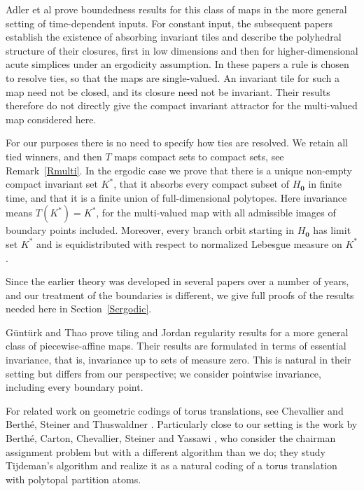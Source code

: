 \documentclass[11pt,reqno,tbtags,a4paper]{amsart}
\numberwithin{equation}{section}
\theoremstyle{plain}%
\theoremstyle{definition}
\theoremstyle{remark}
\newcommand{\refR}[1]{Remark~\ref{#1}}
\newcounter{CC}
\newcommand\Ho{H_{\0}}
\newcommand\etal{{et al\xperiod}}
\newcommand\Kx{K^*}
\newcommand\0{{\boldsymbol 0}}
\newcommand\1{{\boldsymbol 1}}
\begin{document}
Adler \etal{} \cite{adler0} prove boundedness results 
for this class of maps
in the more general
setting of time-dependent inputs. For constant input, the subsequent
papers \cite{adler10,adler17,adler18} establish the existence of absorbing
invariant tiles and describe the polyhedral structure of their closures,
first in low dimensions and then for higher-dimensional acute simplices
under an ergodicity assumption. In these papers a rule is chosen to
resolve ties, so that the maps are single-valued. An invariant tile for
such a map need not be closed, and its closure need not be invariant.
Their results therefore do not directly give the compact invariant
attractor for the multi-valued map considered here.

For our purposes there is no need to specify how ties are resolved.
We retain all tied winners, and then $T$ maps compact sets to compact
sets, see \refR{Rmulti}. In the ergodic case we prove that there is a
unique non-empty compact invariant set $\Kx$, that it absorbs every
compact subset of $\Ho$ in finite time, and that it is a finite union of
full-dimensional polytopes. Here invariance means $T(\Kx)=\Kx$, 
for the multi-valued map
with all
admissible images of boundary points included. Moreover, every branch
orbit starting in $\Ho$ has limit set $\Kx$ and is equidistributed with
respect to normalized Lebesgue measure on $\Kx$.

Since the earlier theory was developed in several papers over a number
of years, and our treatment of the boundaries is different, we give
full proofs of the results needed here in Section~\ref{Sergodic}.

G\"unt\"urk and Thao \cite{gun} prove tiling and Jordan regularity
results for a more general class of piecewise-affine maps. Their results
are formulated in terms of essential invariance, that is, invariance up
to sets of measure zero. This is natural in their setting
but differs from our perspective;  
we consider pointwise invariance, including
every boundary point.

For related work on geometric codings of torus translations, see
Chevallier \cite{Chev} and Berth\'e, Steiner and Thuswaldner
\cite{BST23}. Particularly close to our setting is the work 
by Berth\'e, Carton, Chevallier, Steiner and Yassawi \cite{BCCSY24}, who
consider the chairman assignment problem 
but with a different algorithm than we do; 
they study
Tijdeman's algorithm \cite{Tijdeman80} 
and realize it
as a natural coding of a torus translation
with polytopal partition atoms. 
%
%
%
%
\end{document}
